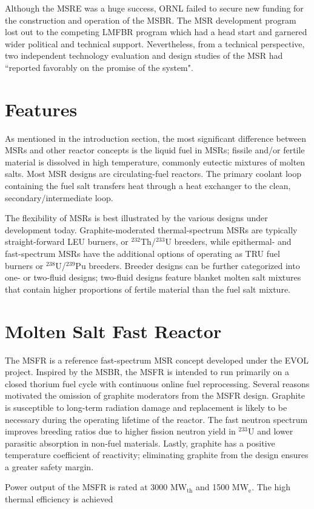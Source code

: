 Although the \gls{MSRE} was a huge success, \gls{ORNL} failed to secure new
funding for the construction and operation of the \gls{MSBR}. The \gls{MSR}
development program lost out to the competing \gls{LMFBR} program which had
a head start and garnered wider political and technical support.
Nevertheless, from a technical perspective, two independent technology
evaluation and design studies of the \gls{MSR} had ``reported favorably on
the promise of the system".

\section{Features}

As mentioned in the introduction section, the most significant difference
between \glspl{MSR} and other reactor
concepts is the liquid fuel in \glspl{MSR}; fissile and/or fertile material
is dissolved in
high temperature, commonly eutectic mixtures of molten salts. Most \gls{MSR}
designs are circulating-fuel reactors. The primary coolant loop containing
the fuel salt transfers heat through a heat exchanger to the clean,
secondary/intermediate loop.

The flexibility of \glspl{MSR} is best illustrated by the various designs
under development today. Graphite-moderated thermal-spectrum \glspl{MSR} are
typically straight-forward \gls{LEU} burners, or $^{232}$Th/$^{233}$U
breeders, while epithermal- and fast-spectrum \glspl{MSR} have the additional
options of operating as \gls{TRU} fuel burners or $^{238}$U/$^{239}$Pu
breeders. Breeder designs can be further categorized into one- or two-fluid
designs; two-fluid designs feature blanket molten salt mixtures that contain
higher proportions of fertile material than the fuel salt mixture.

\section{Molten Salt Fast Reactor}

The \gls{MSFR} is a reference fast-spectrum \gls{MSR} concept developed
under the \gls{EVOL} project. Inspired by the \gls{MSBR}, the \gls{MSFR} is
intended to run primarily on a closed thorium fuel cycle with
continuous online fuel reprocessing. Several reasons motivated the omission of
graphite moderators from the \gls{MSFR} design. Graphite is susceptible to
long-term radiation damage and replacement is likely to be necessary during
the operating lifetime of the reactor. The fast neutron spectrum improves
breeding ratios due to higher fission neutron yield in $^{233}$U and lower
parasitic absorption in non-fuel materials. Lastly, graphite has a positive
temperature coefficient of reactivity; eliminating graphite from the design
ensures a greater safety margin.

Power output of the \gls{MSFR} is rated at 3000 MW$_{\text{th}}$ and 1500
MW$_{\text{e}}$. The high thermal efficiency is achieved 